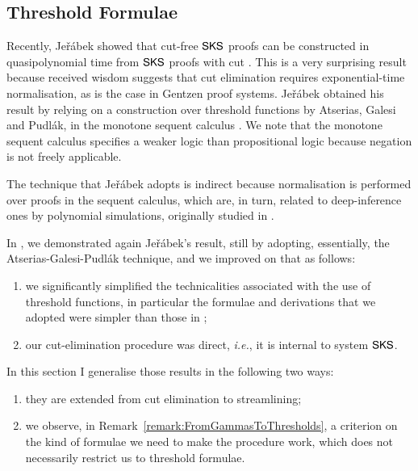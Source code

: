 \subsection{Threshold Formulae}\label{subsection:ThresholdFormulae}

Recently, Je\v r\'abek showed that cut-free $\mathsf{SKS}$ proofs can be constructed in quasipolynomial time from $\mathsf{SKS}$ proofs with cut \cite{Jera::On-the-C:kx}. This is a very surprising result because received wisdom suggests that cut elimination requires exponential-time normalisation, as is the case in Gentzen proof systems. Je\v r\'abek obtained his result by relying on a construction over threshold functions by Atserias, Galesi and Pudl\'ak, in the monotone sequent calculus \cite{AtseGalePudl:02:Monotone:yu}. We note that the monotone sequent calculus specifies a weaker logic than propositional logic because negation is not freely applicable.

The technique that Je\v r\'abek adopts is indirect because normalisation is performed over proofs in the sequent calculus, which are, in turn, related to deep-inference ones by polynomial simulations, originally studied in \cite{Brun:06:Deep-Inf:qy}.

In \cite{BrusGuglGundPari:09:Quasip:fk}, we demonstrated again Je\v r\'abek's result, still by adopting, essentially, the Atserias-Galesi-Pudl\'ak technique, and we improved on that as follows:
\begin{enumerate}
\item we significantly simplified the technicalities associated with the use of threshold functions, in particular the formulae and derivations that we adopted were simpler than those in \cite{AtseGalePudl:02:Monotone:yu};
\item our cut-elimination procedure was direct, \emph{i.e.}, it is internal to system $\mathsf{SKS}$.
\end{enumerate}

In this section I generalise those results in the following two ways:
\begin{enumerate}
\item they are extended from cut elimination to streamlining;
\item we observe, in Remark~\vref{remark:FromGammasToThresholds}, a criterion on the kind of formulae we need to make the procedure work, which does not necessarily restrict us to threshold formulae.
\end{enumerate}

